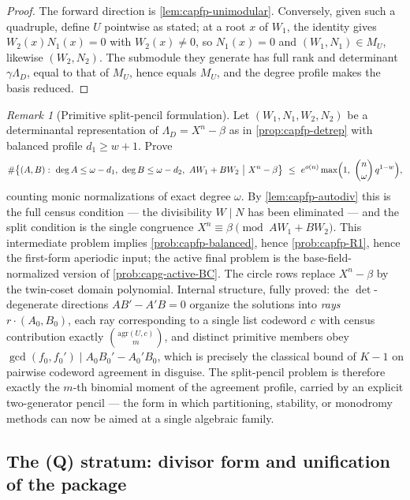 \documentclass[11pt]{article}
\theoremstyle{definition}
\theoremstyle{remark}
\newtheorem{remark}[remark]{Remark}
\begin{document}
\begin{proof}
The forward direction is \cref{lem:capfp-unimodular}.  Conversely, given such a quadruple, define $U$ pointwise as stated; at a root $x$ of $W_1$, the identity gives $W_2(x)N_1(x)=0$ with $W_2(x)\ne0$, so $N_1(x)=0$ and $(W_1,N_1)\in M_U$, likewise $(W_2,N_2)$.  The submodule they generate has full rank and determinant $\gamma\Lambda_D$, equal to that of $M_U$, hence equals $M_U$, and the degree profile makes the basis reduced.
\end{proof}

\begin{remark}[Primitive split-pencil formulation]\label{prob:capfp-split}
Let $(W_1,N_1,W_2,N_2)$ be a determinantal representation of $\Lambda_D=X^n-\beta$ as in \cref{prop:capfp-detrep} with balanced profile $d_1\ge w+1$.  Prove
\[
        \#\bigl\{(A,B):\ \deg A\le\omega-d_1,\ \deg B\le\omega-d_2,\ AW_1+BW_2\ \bigl|\ X^n-\beta\bigr\}
        \ \le\ e^{o(n)}\max\Bigl(1,\ \binom n\omega\,q^{1-w}\Bigr),
\]
counting monic normalizations of exact degree $\omega$.  By \cref{lem:capfp-autodiv} this is the full census condition --- the divisibility $W\mid N$ has been eliminated --- and the split condition is the single congruence $X^n\equiv\beta\pmod{AW_1+BW_2}$.  This intermediate problem implies \cref{prob:capfp-balanced}, hence \cref{prob:capfp-R1}, hence the first-form aperiodic input; the active final problem is the base-field-normalized version of \cref{prob:capg-active-BC}.  The circle rows replace $X^n-\beta$ by the twin-coset domain polynomial.  Internal structure, fully proved: the $\det$-degenerate directions $AB'-A'B=0$ organize the solutions into \emph{rays} $r\cdot(A_0,B_0)$, each ray corresponding to a single list codeword $c$ with census contribution exactly $\binom{\mathrm{agr}(U,c)}{m}$, and distinct primitive members obey $\gcd(f_0,f_0')\mid A_0B_0'-A_0'B_0$, which is precisely the classical bound of $K-1$ on pairwise codeword agreement in disguise.  The split-pencil problem is therefore exactly the $m$-th binomial moment of the agreement profile, carried by an explicit two-generator pencil --- the form in which partitioning, stability, or monodromy methods can now be aimed at a single algebraic family.
\end{remark}

\subsection{The \textup{(Q)} stratum: divisor form and unification of the package}
\end{document}
